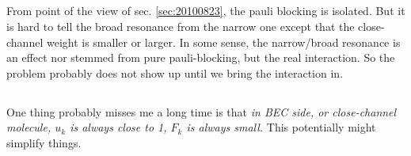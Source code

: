 \subsection{}
From point of the view of sec. \ref{sec:20100823}, the pauli blocking is isolated.  But it is hard to tell the broad resonance from the narrow one except that the close-channel weight is smaller or larger.  In some sense, the narrow/broad resonance is an effect nor stemmed from pure pauli-blocking, but the real interaction. So the problem probably does not show up until we bring the interaction in.   

\subsection{}
One thing probably misses me a long time is that \emph{in BEC side, or close-channel molecule, $u_{k}$ is always close to 1, $F_{k}$ is always small.}  This potentially might simplify things.  